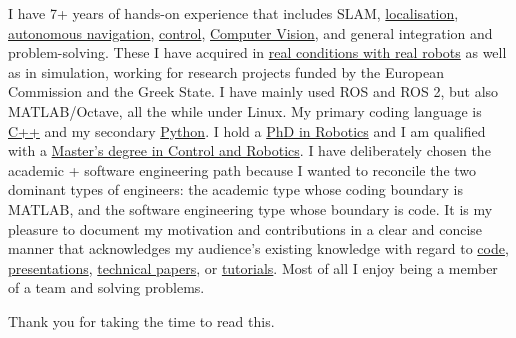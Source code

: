\documentclass[a4paper,10pt,twoside]{article}
\begin{document}

\par{\bigskip\par}


\vspace{-0.5cm}
\begin{bw_box} \small
  I have 7+ years of hands-on experience that includes SLAM, \href{https://github.com/li9i/fsm-lo}{localisation},
  \href{https://link.springer.com/article/10.1007/s10846-019-01086-y}{autonomous navigation}, \href{https://www.tandfonline.com/doi/full/10.1080/00207179.2018.1514129}{control},
  \href{https://github.com/li9i/pandora\_vision\_2014}{Computer Vision}, and
  general integration and problem-solving. These I have acquired in \href{https://relief.web.auth.gr/\%CF\%81\%CE\%BF\%CE\%BC\%CF\%80\%CE\%BF\%CF\%84\%CE\%B9\%CE\%BA\%CE\%AC-\%CE\%BF\%CF\%87\%CE\%AE\%CE\%BC\%CE\%B1\%CF\%84\%CE\%B1/}{real
  conditions with real robots} as well as in simulation, working for research
  projects funded by the European Commission and the Greek State. I have mainly
  used ROS and ROS 2, but also MATLAB/Octave, all the while under Linux. My
  primary coding language is \href{https://github.com/li9i/fsm}{C++} and my
  secondary
  \href{https://github.com/cultureid-auth-ros-packages/cultureid-waypoints-following}{Python}.
  I hold a \href{https://ikee.lib.auth.gr/record/354644}{PhD in Robotics} and I
  am qualified with a
  \href{http://kth.diva-portal.org/smash/record.jsf?pid=diva2\%3A1102597\&dswid=2875}{Master's degree in Control and Robotics}.
  I have deliberately chosen the academic + software engineering path because I
  wanted to reconcile the two dominant types of engineers: the academic type
  whose coding boundary is MATLAB, and the software engineering type whose
  boundary is code.
  It is my pleasure to document my motivation and contributions in a clear and concise
  manner that acknowledges my audience's existing knowledge with regard to
  \href{https://github.com/li9i/pandora_vision_2014/blob/hydro-devel/pandora_vision_hole_detector/src/hole_fusion_node/hole_fusion.cpp}{code},
  \href{https://www.youtube.com/watch?v=xaDKjI0WkDc}{presentations}, \href{https://ieeexplore.ieee.org/abstract/document/9981228}{technical papers},
  or \href{https://github.com/li9i/ros1_humble_bridge_template}{tutorials}. Most of all I enjoy being a member of a team and solving problems.

  Thank you for taking the time to read this.
\end{bw_box}
\end{document}
